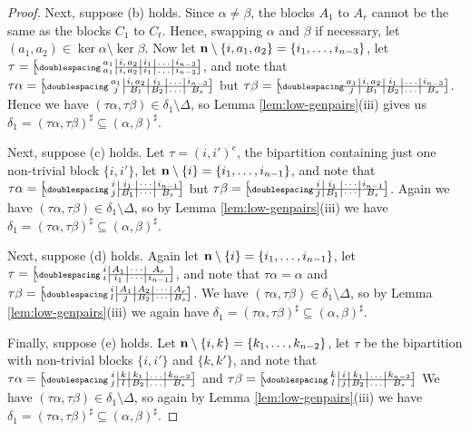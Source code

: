 \begin{lemma}
\begin{proof}
    Next, suppose (b) holds.
    Since $\alpha \neq \beta$, the blocks $A_1$ to $A_r$ cannot be the same as
    the blocks $C_1$ to $C_t$.  Hence, swapping $\alpha$ and $\beta$ if
    necessary, let $(a_1,a_2) \in \ker\alpha \setminus \ker\beta$.  Now let
    $\mathbf{n} \setminus \{i,a_1,a_2\} = \{i_1, \ldots, i_{n-3}\}$, let
    $\tau=\bipart{c|c|c|c|c}{2-5}
    {a_1 & i,a_2 & i_1 & \ldots & i_{n-3}}
    {a_1 & i,a_2 & i_1 & \ldots & i_{n-3}}$,
    and note that
    $\tau\alpha = \bipart{c|c|c|c|c}{2-5}
    {a_1 & i,a_2 & i_1 & \ldots & i_{n-3}}{j & B_1 & B_2 & \ldots & B_s}$ but
    $\tau\beta = \bipart{c|c|c|c|c}{1-5}
    {a_1 & i,a_2 & i_1 & \ldots & i_{n-3}}{j & B_1 & B_2 & \ldots & B_s}$.
    Hence we have $(\tau\alpha,\tau\beta) \in \delta_1 \setminus \Delta$, so
    Lemma \ref{lem:low-genpairs}(iii) gives us
    $\delta_1 = (\tau\alpha,\tau\beta)^\sharp \subseteq (\alpha,\beta)^\sharp$.

    Next, suppose (c) holds.  Let $\tau = (i,i')^e$, the
    bipartition containing just one non-trivial block $\{i,i'\}$, let
    $\mathbf{n} \setminus \{i\}=\{i_1,\ldots,i_{n-1}\}$, and note that
    $\tau\alpha = \bipart{c|c|c|c}{2-4}
    {i & i_1 & \cdots & i_{n-1}}{j & B_1 & \cdots & B_s}$ but
    $\tau\beta = \bipart{c|c|c|c}{1-4}
    {i & i_1 & \cdots & i_{n-1}}{j & B_1 & \cdots & B_s}$.
    Again we have $(\tau\alpha,\tau\beta) \in \delta_1 \setminus \Delta$, so by
    Lemma \ref{lem:low-genpairs}(iii) we have
    $\delta_1 = (\tau\alpha,\tau\beta)^\sharp \subseteq (\alpha,\beta)^\sharp$.

    Next, suppose (d) holds.
    Again let $\mathbf{n}\setminus\{i\}=\{i_1,\ldots,i_{n-1}\}$, let
    $\tau=\bipart{c|c|c|c}{2-4}
    {i & A_1 & \cdots & A_r}{i & i_1 & \cdots & i_{n-1}}$, and note that
    $\tau\alpha = \alpha $ and
    $\tau\beta = \bipart{c|c|c|c|c}{2-5}
    {i & A_1 & A_2 & \cdots & A_r}{l & j & B_2 & \cdots & B_s}$.
    We have $(\tau\alpha,\tau\beta) \in \delta_1 \setminus \Delta$, so by
    Lemma \ref{lem:low-genpairs}(iii) we again have
    $\delta_1=(\tau\alpha, \tau\beta)^\sharp\subseteq(\alpha,\beta)^\sharp$.

    Finally, suppose (e) holds.
    Let $\mathbf{n}\setminus\{i,k\}=\{k_1,\ldots,k_{n-2}\}$, let
    $\tau$ be the bipartition with non-trivial blocks $\{i,i'\}$ and $\{k,k'\}$,
    and note that
    $\tau\alpha=\bipart{c|c|c|c|c}{2-5}
    {i & k & k_1 & \ldots & k_{n-2}}
    {j & l & B_2 & \ldots & B_s}$
    and
    $\tau\beta=\bipart{c|c|c|c|c}{2-5}
    {k & i & k_1 & \ldots & k_{n-2}}
    {l & j & B_2 & \ldots & B_s}$
    We have $(\tau\alpha,\tau\beta) \in \delta_1 \setminus \Delta$, so again by
    Lemma \ref{lem:low-genpairs}(iii) we have
    $\delta_1 = (\tau\alpha, \tau\beta)^\sharp \subseteq (\alpha,\beta)^\sharp$.


\end{proof}
\end{lemma}
